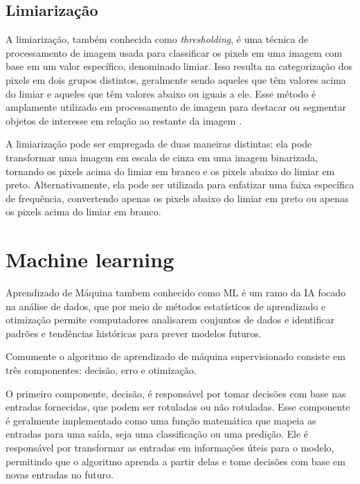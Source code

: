 \subsection[Limiarização]{Limiarização}

A limiarização, também conhecida como \textit{thresholding}, é uma técnica de processamento de imagem usada para classificar os pixels em uma imagem com base em um valor específico, denominado limiar. Isso resulta na categorização dos pixels em dois grupos distintos, geralmente sendo aqueles que têm valores acima do limiar e aqueles que têm valores abaixo ou iguais a ele. Esse método é amplamente utilizado em processamento de imagem para destacar ou segmentar objetos de interesse em relação ao restante da imagem \cite{limiarizacao}.

A limiarização pode ser empregada de duas maneiras distintas: ela pode transformar uma imagem em escala de cinza em uma imagem binarizada, tornando os pixels acima do limiar em branco e os pixels abaixo do limiar em preto. Alternativamente, ela pode ser utilizada para enfatizar uma faixa específica de frequência, convertendo apenas os pixels abaixo do limiar em preto ou apenas os pixels acima do limiar em branco\cite{opencv_thresholding}.


\section[Machine learning]{Machine learning}\label{sec:Machine learning}

Aprendizado de Máquina tambem conhecido como \ac{ML} é um ramo da \ac{IA} focado na análise de dados, que por meio de métodos estatísticos de aprendizado e otimização  permite computadores analisarem conjuntos de dados e identificar padrões e tendências históricas para prever modelos futuros.\cite{ml}

Comumente o algoritmo de aprendizado de máquina supervisionado consiste em três componentes: decisão, erro e otimização. 

O primeiro componente, decisão, é responsável por tomar decisões com base nas entradas fornecidas, que podem ser rotuladas ou não rotuladas. Esse componente é geralmente implementado como uma função matemática que mapeia as entradas para uma saída, seja uma classificação ou uma predição. Ele é responsável por transformar as entradas em informações úteis para o modelo, permitindo que o algoritmo aprenda a partir delas e tome decisões com base em novas entradas no futuro.

